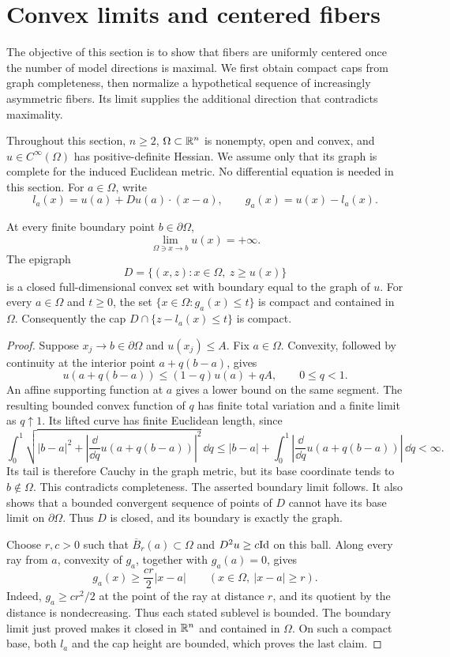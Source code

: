 \section{Convex limits and centered fibers}\label{sec:geometry}

The objective of this section is to show that fibers are uniformly
centered once the number of model directions is maximal. We first
obtain compact caps from graph completeness, then normalize a hypothetical
sequence of increasingly asymmetric fibers. Its limit supplies the
additional direction that contradicts maximality.

Throughout this section, $n\ge2$, $\Omega\subset\mathbb R^n$ is nonempty,
open and convex, and $u\in C^\infty(\Omega)$ has positive-definite Hessian.
We assume only that its graph is complete for the induced Euclidean
metric.  No differential equation is needed in this section.
For $a\in\Omega$, write
\[
 l_a(x)=u(a)+Du(a)\cdot(x-a),
 \qquad g_a(x)=u(x)-l_a(x).
\]

\begin{lemma}\label{lem:proper-sections}
At every finite boundary point $b\in\partial\Omega$,
\[
 \lim_{\Omega\ni x\to b}u(x)=+\infty.
\]
The epigraph
\[
 D=\{(x,z):x\in\Omega,\ z\ge u(x)\}
\]
is a closed full-dimensional convex set with boundary equal to the
graph of $u$.  For every $a\in\Omega$ and $t\ge0$, the set
$\{x\in\Omega:g_a(x)\le t\}$ is compact and contained in $\Omega$.
Consequently the cap $D\cap\{z-l_a(x)\le t\}$ is compact.
\end{lemma}

\begin{proof}
Suppose $x_j\to b\in\partial\Omega$ and $u(x_j)\le A$.
Fix $a\in\Omega$.  Convexity, followed by continuity at the interior
point $a+q(b-a)$, gives
\[
 u(a+q(b-a))\le (1-q)u(a)+qA,\qquad 0\le q<1.
\]
An affine supporting function at $a$ gives a lower bound on the same
segment.  The resulting bounded convex function of $q$ has finite
total variation and a finite limit as $q\uparrow1$.  Its lifted curve
has finite Euclidean length, since
\[
 \int_0^1\sqrt{|b-a|^2+
       \left|\frac{\dd}{\dd q}u(a+q(b-a))\right|^2}\,\dd q
 \le |b-a|+\int_0^1
       \left|\frac{\dd}{\dd q}u(a+q(b-a))\right|\,\dd q<\infty.
\]
Its tail is therefore Cauchy in the graph metric, but its base
coordinate tends to $b\notin\Omega$.  This contradicts completeness.
The asserted boundary limit follows.  It also shows that a bounded
convergent sequence of points of $D$ cannot have its base limit on
$\partial\Omega$.  Thus $D$ is closed, and its boundary is exactly
the graph.

Choose $r,c>0$ such that $\overline B_r(a)\subset\Omega$ and
$D^2u\ge c\mathrm{Id}$ on this ball.  Along every ray from $a$, convexity of
$g_a$, together with $g_a(a)=0$, gives
\[
 g_a(x)\ge \frac{cr}{2}|x-a|
 \qquad (x\in\Omega,\ |x-a|\ge r).
\]
Indeed, $g_a\ge cr^2/2$ at the point of the ray at distance $r$,
and its quotient by the distance is nondecreasing.  Thus each stated
sublevel is bounded.  The boundary limit just proved makes it closed
in $\mathbb R^n$ and contained in $\Omega$.  On such a compact base, both
$l_a$ and the cap height are bounded, which proves the last claim.
\end{proof}

